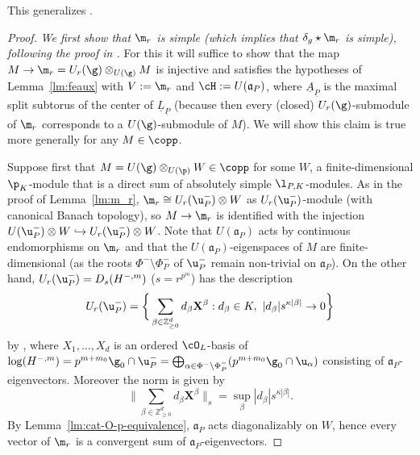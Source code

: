 \documentclass[a4paper]{amsart}
\numberwithin{equation}{section}
\theoremstyle{remark}
\theoremstyle{definition}
\newcommand{\Z}{\mathbb{Z}}
\newcommand{\alggrp}[1]{\underline{#1}}
\newcommand{\into}{\hookrightarrow}
\begin{document}
This generalizes \cite[Theorem 4.7]{OS3}.

\begin{proof}
  \emph{We first show that $\m_r$ is simple (which implies that $\delta_g \star \m_r$ is simple), following the proof in \cite[Theorem 4.5]{OS3}.}
  For this it will suffice to show that the map $M \to \m_r = U_r(\g)\otimes_{U(\g)} M$ is injective and satisfies the hypotheses of Lemma~\ref{lm:feaux} with $V := \m_r$
  and $\cH := U(\mathfrak a_P)$, where $\alggrp A_{\alggrp P}$ is the maximal split subtorus of the center of $\alggrp L_{\alggrp P}$ (because then every (closed) $U_r(\g)$-submodule
  of $\m_r$ corresponds to a $U(\g)$-submodule of $M$). 
  We will show this claim is true more generally for any $M \in \copp$.

  Suppose first that $M = U(\g) \otimes_{U(\p)} W \in \copp$ for some $W$, a finite-dimensional $\p_K$-module that is a direct sum of absolutely simple $\l_{P,K}$-modules. 
  As in the proof of Lemma~\ref{lm:m_r}, $\m_r \cong U_r(\u_P^-) \otimes W$ as $U_r(\u_P^-)$-module (with canonical Banach topology), so 
  $M \to \m_r$ is identified with the injection $U(\u_P^-) \otimes W \into U_r(\u_P^-) \otimes W$.
  Note that $U(\mathfrak a_P)$ acts by continuous endomorphisms on $\m_r$ and that the $U(\mathfrak a_P)$-eigenspaces of $M$ are finite-dimensional 
  (as the roots $\Phi^-\setminus \Phi_P^-$ of $\u_P^-$ remain non-trivial on $\mathfrak a_P$).
  On the other hand, $U_r(\u_P^-) = D_s(H^{-,m})$ ($s = r^{p^m}$) has the description
  \begin{equation*}
    U_r(\u_P^-) = \bigg\{ \sum_{\beta \in \Z_{\ge 0}^d} d_\beta \mathbf{X}^\beta : d_\beta \in K,\ |d_\beta| s^{\kappa|\beta|} \to 0 \bigg\}
  \end{equation*}
  by \cite[\S5]{schmidt}, where $X_1,\dots,X_d$ is an ordered $\cO_L$-basis of
  $\log(H^{-,m}) = p^{m+m_0} \g_0 \cap \u_P^- = \bigoplus_{\alpha \in \Phi^-\setminus \Phi_P^-} (p^{m+m_0} \g_0 \cap
  \u_\alpha)$ consisting of $\mathfrak a_P$-eigenvectors. Moreover the norm is given by
  \begin{equation*}
    \bigg\lVert \sum_{\beta \in \Z_{\ge 0}^d} d_\beta \mathbf{X}^\beta \bigg\rVert_s = \sup_\beta |d_\beta| s^{\kappa|\beta|}.
  \end{equation*}
  By Lemma~\ref{lm:cat-O-p-equivalence}, $\mathfrak a_P$ acts diagonalizably on $W$, hence every vector of $\m_r$
  is a convergent sum of $\mathfrak a_P$-eigenvectors.


\end{proof}
\end{document}
